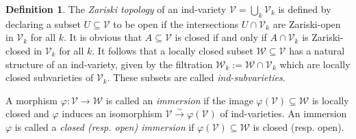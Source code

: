 \documentclass{amsart}
\theoremstyle{definition}
\newtheorem{defn}[thm]{Definition}
\theoremstyle{remark}
\begin{document}
\begin{defn} 
The {\it Zariski topology} of an ind-variety ${\mathcal V}=\bigcup_{k}{\mathcal V}_{k}$ is defined by declaring a subset $U {\subseteq} {\mathcal V}$ to be open if the intersections $U \cap{\mathcal V}_{k}$ are Zariski-open in ${\mathcal V}_{k}$ for all $k$. It is obvious that $A {\subseteq} {\mathcal V}$ is closed if and only if  $A \cap{\mathcal V}_{k}$ is Zariski-closed in ${\mathcal V}_{k}$ for all $k$. It follows that a locally closed subset ${\mathcal W} {\subseteq} {\mathcal V}$ has a natural structure of an ind-variety, given by the filtration ${\mathcal W}_{k}:={\mathcal W} \cap {\mathcal V}_{k}$ which are locally closed subvarieties of ${\mathcal V}_{k}$. These subsets are called {\it ind-subvarieties}.

A morphism ${\varphi}\colon {\mathcal V} \to {\mathcal W}$ is called an {\it immersion} if the image ${\varphi}({\mathcal V}) {\subseteq} {\mathcal W}$ is locally closed and ${\varphi}$ induces an isomorphism ${\mathcal V} {\xrightarrow{\sim}} {\varphi}({\mathcal V})$ of ind-varieties. An immersion ${\varphi}$ is called a {\it closed (resp. open) immersion} if ${\varphi}({\mathcal V}) {\subseteq} {\mathcal W}$ is closed (resp. open).
\end{defn}
\end{document}
